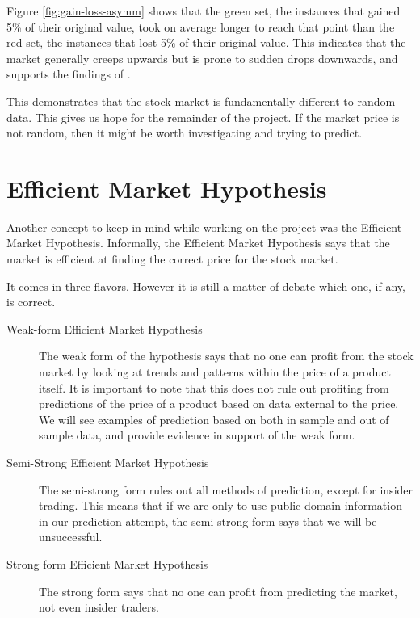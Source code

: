 \documentclass{report}
\begin{document}
Figure \ref{fig:gain-loss-asymm} shows that the green set, the instances that gained 5\% of their original value, took on average longer to reach that point than the red set, the instances that lost 5\% of their original value. This indicates that the market generally creeps upwards but is prone to sudden drops downwards, and supports the findings of \citet{karpio2007gain}.

This demonstrates that the stock market is fundamentally different to random data. This gives us hope for the remainder of the project. If the market price is not random, then it might be worth investigating and trying to predict.

\section{Efficient Market Hypothesis}

Another concept to keep in mind while working on the project was the Efficient Market Hypothesis. Informally, the Efficient Market Hypothesis says that the market is efficient at finding the correct price for the stock market.

It comes in three flavors. However it is still a matter of debate which one, if any, is correct.

\begin{description}
  \item[Weak-form Efficient Market Hypothesis] 
  The weak form of the hypothesis says that no one can profit from the stock market by looking at trends and patterns within the price of a product itself. It is important to note that this does not rule out profiting from predictions of the price of a product based on data external to the price. We will see examples of prediction based on both in sample and out of sample data, and provide evidence in support of the weak form.
  
  \item[Semi-Strong Efficient Market Hypothesis]
  The semi-strong form rules out all methods of prediction, except for insider trading. This means that if we are only to use public domain information in our prediction attempt, the semi-strong form says that we will be unsuccessful.
  
  \item[Strong form Efficient Market Hypothesis]
  The strong form says that no one can profit from predicting the market, not even insider traders.
\end{description}
\end{document}
